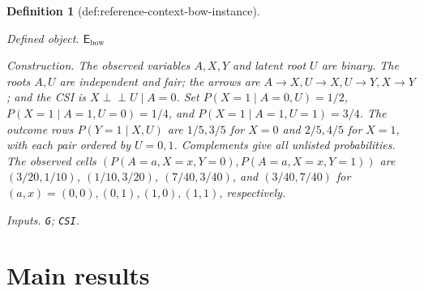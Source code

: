 \documentclass{article}
\newtheorem{definition}{Definition}
\begin{document}
\begin{definition}[def:reference-context-bow-instance]\label{def:reference-context-bow-instance}
\par\smallskip\noindent\emph{Defined object.} \(\mathsf E_{\mathrm{bow}}\)
\par\smallskip\noindent\emph{Construction.} The observed variables \(A,X,Y\) and latent root \(U\) are binary. The roots \(A,U\) are independent and fair; the arrows are \(A\to X,U\to X,U\to Y,X\to Y\); and the CSI is \(X\mathbin{\perp\!\!\!\perp}U\mid A=0\). Set \(P(X=1\mid A=0,U)=1/2\), \(P(X=1\mid A=1,U=0)=1/4\), and \(P(X=1\mid A=1,U=1)=3/4\). The outcome rows \(P(Y=1\mid X,U)\) are \(1/5,3/5\) for \(X=0\) and \(2/5,4/5\) for \(X=1\), with each pair ordered by \(U=0,1\). Complements give all unlisted probabilities. The observed cells \((P(A=a,X=x,Y=0),P(A=a,X=x,Y=1))\) are \((3/20,1/10)\), \((1/10,3/20)\), \((7/40,3/40)\), and \((3/40,7/40)\) for \((a,x)=(0,0),(0,1),(1,0),(1,1)\), respectively.
\par\smallskip\noindent\emph{Inputs.} \texttt{G}; \texttt{CSI}.
\end{definition}

\section{Main results}
\end{document}
